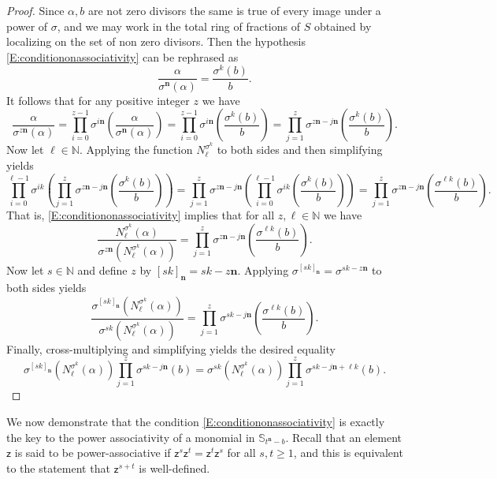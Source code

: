 \documentclass[11pt]{amsart}
\theoremstyle{plain}
\theoremstyle{definition}
\numberwithin{equation}{section}
\numberwithin{figure}{section}
\newcommand{\Sone}[1]{\Stsigma/\Stsigma (t^{\de}-#1)} %
\newcommand{\ring}{S}
\newcommand{\Stsigma}{S[t;\sigma]}
\newcommand{\scz}{\mathsf{z}}  %
\newcommand{\de}{\mathbf{n}}  %
\begin{document}
\begin{proof}
   Since $\alpha,b$ are not zero divisors the same is true of every image under a power of $\sigma$, and we may work in the total ring of fractions of $\ring$ obtained by localizing on the set of non zero divisors. Then the hypothesis \eqref{E:conditiononassociativity} can be rephrased as
   $$
    \frac{\alpha}{\sigma^{\de}(\alpha)}=\frac{\sigma^k(b)}{b}.
    $$
It follows that for any positive integer $z$ we have
$$
\frac{\alpha}{\sigma^{z{\de}}(\alpha)} = \prod_{i=0}^{z-1} \sigma^{i{\de}}\left(\frac{\alpha}{\sigma^{\de}(\alpha)}\right)= \prod_{i=0}^{z-1} \sigma^{i{\de}}\left(\frac{\sigma^k(b)}{b}\right)= \prod_{j=1}^{z}\sigma^{z{\de}-j{\de}}\left(\frac{\sigma^k(b)}{b}\right).
$$
Now let $\ell \in \mathbb{N}$.  Applying the function $N_\ell^{\sigma^k}$ to both sides and then simplifying yields
$$
  \prod_{i=0}^{\ell-1}\sigma^{ik}\left( \prod_{j=1}^{z}\sigma^{z{\de}-j{\de}}\left(\frac{\sigma^k(b)}{b}\right) \right)
  = \prod_{j=1}^{z}\sigma^{z{\de}-j{\de}}\left(\prod_{i=0}^{\ell-1}\sigma^{ik}\left(\frac{\sigma^k(b)}{b}\right) \right) = \prod_{j=1}^{z}\sigma^{z{\de}-j{\de}}\left(\frac{\sigma^{\ell k}(b)}{b}\right).
$$
That is, \eqref{E:conditiononassociativity} implies that for all $z,\ell\in \mathbb{N}$ we have
$$
\frac{N_{\ell}^{\sigma^k}(\alpha)}{\sigma^{z{\de}}(N_{\ell}^{\sigma^k}(\alpha))} =  \prod_{j=1}^{z}\sigma^{z{\de}-j{\de}}\left(\frac{\sigma^{\ell k}(b)}{b}\right).
$$
Now let $s\in \mathbb{N}$ and define $z$ by $[sk]_{\de}=sk-z{\de}$.  Applying $\sigma^{[sk]_{\de}}=\sigma^{sk-z{\de}}$ to both sides yields
$$
\frac{\sigma^{[sk]_{\de}}(N_{\ell}^{\sigma^k}(\alpha))}{\sigma^{sk}(N_{\ell}^{\sigma^k}(\alpha))}
=
\prod_{j=1}^{z}\sigma^{sk-j{\de}}\left(\frac{\sigma^{\ell k}(b)}{b}\right).
$$
Finally, cross-multiplying and simplifying yields the desired equality
$$
\sigma^{[sk]_{\de}}(N_{\ell}^{\sigma^k}(\alpha))\prod_{j=1}^{z}\sigma^{sk-j{\de}}(b) = \sigma^{sk}(N_{\ell}^{\sigma^k}(\alpha))\prod_{j=1}^{z}\sigma^{sk-j{\de}+\ell k}(b).
$$
\end{proof}

We now demonstrate that the condition \eqref{E:conditiononassociativity} is exactly the key to the power associativity of a monomial in $\mathbb{S}_{t^\de-b}$.
Recall that an element $\scz$ is said to be power-associative if $\scz^s \scz^t=\scz^t \scz^s$ for all $s,t\geq 1$, and this is equivalent to the statement that $\scz^{s+t}$ is well-defined.
\end{document}
